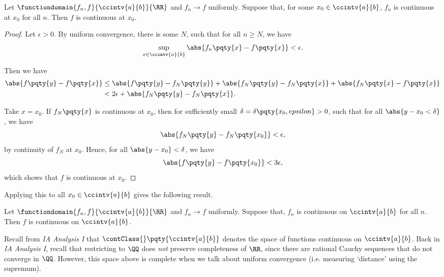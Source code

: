 \begin{theorem}
    Let \(\functiondomain{f_n, f}{\ccintv{a}{b}}{\RR}\) and \(f_n \to f\) uniformly. Suppose that, for some \(x_0 \in \ccintv{a}{b}\), \(f_n\) is continuous at \(x_0\) for all \(n\). Then \(f\) is continuous at \(x_0\).
\end{theorem}

\begin{proof}
    Let \(\epsilon > 0\). By uniform convergence, there is some \(N\), such that for all \(n \geq N\), we have
    \[
        \sup_{x \in \ccintv{a}{b}} \abs{f_n\pqty{x} - f\pqty{x}} < \epsilon.
    \]

    Then we have
    \begin{align*}
        \abs{f\pqty{y} - f\pqty{x}} &\leq \abs{f\pqty{y} - f_N\pqty{y}} + \abs{f_N\pqty{y} - f_N\pqty{x}} + \abs{f_N\pqty{x} - f\pqty{x}} \\
        &< 2\epsilon + \abs{f_N\pqty{y} - f_N\pqty{x}}.
    \end{align*}

    Take \(x = x_0\). If \(f_N\pqty{x}\) is continuous at \(x_0\), then for sufficiently small \(\delta = \delta\pqty{x_0, epsilon} > 0\), such that for all \(\abs{y - x_0 < \delta}\), we have
    \[
        \abs{f_N\pqty{y} - f_N\pqty{x_0}} < \epsilon,
    \]
    by continuity of \(f_N\) at \(x_0\). Hence, for all \(\abs{y - x_0} < \delta\), we have
    \[
        \abs{f\pqty{y} - f\pqty{x_0}} < 3 \epsilon,
    \]
    which shows that \(f\) is continuous at \(x_0\).
\end{proof}

Applying this to all \(x_0 \in \ccintv{a}{b}\) gives the following result.

\begin{corollary}
    \label{cor:uniform-convergence-preserves-continuity}%
    Let \(\functiondomain{f_n, f}{\ccintv{a}{b}}{\RR}\) and \(f_n \to f\) uniformly. Suppose that, \(f_n\) is continuous on \(\ccintv{a}{b}\) for all \(n\). Then \(f\) is continuous on \(\ccintv{a}{b}\).
\end{corollary}

Recall from \textit{IA Analysis I} that \(\contClass{}\pqty{\ccintv{a}{b}}\) denotes the space of functions continuous on \(\ccintv{a}{b}\). Back in \textit{IA Analysis I}, recall that restricting to \(\QQ\) does \emph{not} preserve completeness of \(\RR\), since there are rational Cauchy sequences that do not converge in \(\QQ\). However, this space above is complete when we talk about uniform convergence (i.e. measuring `distance' using the supremum).

